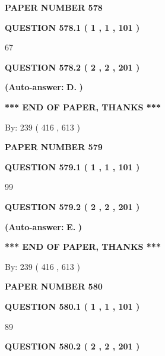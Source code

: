 \documentclass[12pt]{article}
\begin{document}
   
\newpage 
\setcounter{page}{ 
   578001 } 
   
   
 {\textbf{ \Large{ PAPER NUMBER  578  }}}
   
   
   
   
  
  
{\textbf{\large{QUESTION
578.1 
 ( 1 , 1 , 101 )
}}}

67
  
  
{\textbf{\large{QUESTION
578.2 
 ( 2 , 2 , 201 )
}}}
 
 
{\textbf{(Auto-answer:}}
{\textbf{\large{
D.}}}
{\textbf{)}}
 
 
   
   
   
   
\vspace{1.0in} 
{\textbf{\large{ *** END OF PAPER, THANKS *** }}} 
   
   
\hspace{1.0in} By: 
 239 ( 416 ,  613 )
   
   
   
   
\newpage 
\setcounter{page}{ 
   579001 } 
   
   
 {\textbf{ \Large{ PAPER NUMBER  579  }}}
   
   
   
   
  
  
{\textbf{\large{QUESTION
579.1 
 ( 1 , 1 , 101 )
}}}

99
  
  
{\textbf{\large{QUESTION
579.2 
 ( 2 , 2 , 201 )
}}}
 
 
{\textbf{(Auto-answer:}}
{\textbf{\large{
E.}}}
{\textbf{)}}
 
 
   
   
   
   
\vspace{1.0in} 
{\textbf{\large{ *** END OF PAPER, THANKS *** }}} 
   
   
\hspace{1.0in} By: 
 239 ( 416 ,  613 )
   
   
   
   
\newpage 
\setcounter{page}{ 
   580001 } 
   
   
 {\textbf{ \Large{ PAPER NUMBER  580  }}}
   
   
   
   
  
  
{\textbf{\large{QUESTION
580.1 
 ( 1 , 1 , 101 )
}}}

89
  
  
{\textbf{\large{QUESTION
580.2 
 ( 2 , 2 , 201 )
}}}
 
\end{document}
